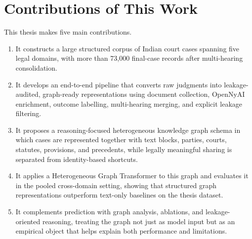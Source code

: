 \section{Contributions of This Work}

This thesis makes five main contributions.

\begin{enumerate}
    \item It constructs a large structured corpus of Indian court cases spanning five legal domains, with more than 73{,}000 final-case records after multi-hearing consolidation.

    \item It develops an end-to-end pipeline that converts raw judgments into leakage-audited, graph-ready representations using document collection, OpenNyAI enrichment, outcome labelling, multi-hearing merging, and explicit leakage filtering.

    \item It proposes a reasoning-focused heterogeneous knowledge graph schema in which cases are represented together with text blocks, parties, courts, statutes, provisions, and precedents, while legally meaningful sharing is separated from identity-based shortcuts.

    \item It applies a Heterogeneous Graph Transformer to this graph and evaluates it in the pooled cross-domain setting, showing that structured graph representations outperform text-only baselines on the thesis dataset.

    \item It complements prediction with graph analysis, ablations, and leakage-oriented reasoning, treating the graph not just as model input but as an empirical object that helps explain both performance and limitations.
\end{enumerate}

